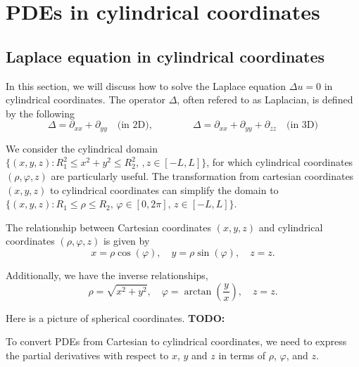 \section{PDEs in cylindrical coordinates}

\subsection{Laplace equation in cylindrical coordinates}

In this section, we will discuss how to solve the Laplace equation $\Delta u = 0$ in cylindrical coordinates. The operator $\Delta$, often refered to as Laplacian, is defined by the following
\begin{equation}\label{eq.Laplacian}
    \Delta = \partial_{xx} + \partial_{yy} \quad \textrm{(in 2D)},\qquad\qquad \Delta = \partial_{xx} + \partial_{yy} + \partial_{zz} \quad \textrm{(in 3D)}
\end{equation}

We consider the cylindrical domain $\{(x, y, z): R_1^2\le x^2 + y^2 \le R_2^2,\,, z\in [-L, L]\}$, for which cylindrical coordinates $(\rho, \varphi, z)$ are particularly useful. The transformation from cartesian coordinates $(x, y, z)$ to cylindrical coordinates can simplify the domain to $\{(x, y, z): R_1\le \rho \le R_2,\,\varphi\in [0, 2\pi],\,z\in [-L, L]\}$.

The relationship between Cartesian coordinates $(x, y, z)$ and cylindrical coordinates $(\rho, \varphi, z)$ is given by
\begin{equation}\label{eq.from_cartesian_to_cylindrical}
    x = \rho \cos(\varphi), \quad y = \rho \sin(\varphi), \quad z = z.
\end{equation}

Additionally, we have the inverse relationships,
\begin{equation}\label{eq.from_cylindrical_to_cartesian}
    \rho = \sqrt{x^2 + y^2}, \quad \varphi = \arctan\left(\frac{y}{x}\right), \quad z = z.
\end{equation}

Here is a picture of spherical coordinates.
\textbf{TODO: }

To convert PDEs from Cartesian to cylindrical coordinates, we need to express the partial derivatives with respect to $x$, $y$ and $z$ in terms of $\rho$, $\varphi$, and $z$.

